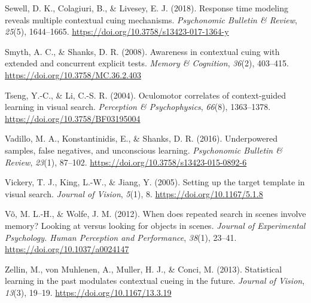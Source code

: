\documentclass[
  man,floatsintext]{apa7}
\newlength{\cslhangindent}
\newlength{\cslentryspacingunit} %
\newenvironment{CSLReferences}[2] %
 {%
  \setlength{\parindent}{0pt}
  \ifodd #1
  \let\oldpar\par
  \def\par{\hangindent=\cslhangindent\oldpar}
  \fi
  \setlength{\parskip}{#2\cslentryspacingunit}
 }%
 {}
\begin{document}
\begin{CSLReferences}{1}{0}
\leavevmode{}%
Sewell, D. K., Colagiuri, B., \& Livesey, E. J. (2018). Response time modeling reveals multiple contextual cuing mechanisms. \emph{Psychonomic Bulletin \& Review}, \emph{25}(5), 1644--1665. \url{https://doi.org/10.3758/s13423-017-1364-y}

\leavevmode{}%
Smyth, A. C., \& Shanks, D. R. (2008). Awareness in contextual cuing with extended and concurrent explicit tests. \emph{Memory \& Cognition}, \emph{36}(2), 403--415. \url{https://doi.org/10.3758/MC.36.2.403}

\leavevmode{}%
Tseng, Y.-C., \& Li, C.-S. R. (2004). Oculomotor correlates of context-guided learning in visual search. \emph{Perception \& Psychophysics}, \emph{66}(8), 1363--1378. \url{https://doi.org/10.3758/BF03195004}

\leavevmode{}%
Vadillo, M. A., Konstantinidis, E., \& Shanks, D. R. (2016). Underpowered samples, false negatives, and unconscious learning. \emph{Psychonomic Bulletin \& Review}, \emph{23}(1), 87--102. \url{https://doi.org/10.3758/s13423-015-0892-6}

\leavevmode{}%
Vickery, T. J., King, L.-W., \& Jiang, Y. (2005). Setting up the target template in visual search. \emph{Journal of Vision}, \emph{5}(1), 8. \url{https://doi.org/10.1167/5.1.8}

\leavevmode{}%
Võ, M. L.-H., \& Wolfe, J. M. (2012). When does repeated search in scenes involve memory? {Looking} at versus looking for objects in scenes. \emph{Journal of Experimental Psychology. Human Perception and Performance}, \emph{38}(1), 23--41. \url{https://doi.org/10.1037/a0024147}

\leavevmode{}%
Zellin, M., von Muhlenen, A., Muller, H. J., \& Conci, M. (2013). Statistical learning in the past modulates contextual cueing in the future. \emph{Journal of Vision}, \emph{13}(3), 19--19. \url{https://doi.org/10.1167/13.3.19}

\end{CSLReferences}
\end{document}
